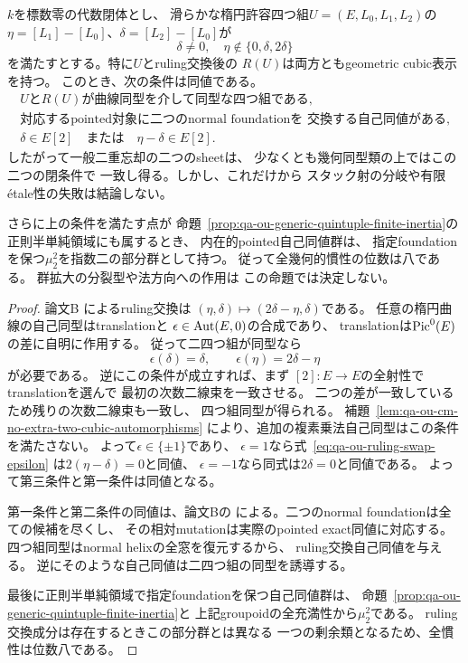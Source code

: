 \begin{proposition}[楕円型のruling交換自己同値の正確な二捩れ条件]
\label{prop:qa-elliptic-ruling-swap-two-torsion}
$k$を標数零の代数閉体とし、
滑らかな楕円許容四つ組$U=(E,L_0,L_1,L_2)$の
$\eta=[L_1]-[L_0]$、$\delta=[L_2]-[L_0]$が
\[
 \delta\ne0,\quad \eta\notin\{0,\delta,2\delta\}
\]
を満たすとする。特に$U$とruling交換後の
$R(U)$は両方ともgeometric cubic表示を持つ。
このとき、次の条件は同値である。
\[
 \begin{gathered}
 \text{$U$と$R(U)$が曲線同型を介して同型な四つ組である},\\
 \text{対応するpointed対象に二つのnormal foundationを
 交換する自己同値がある},\\
 \delta\in E[2]\quad\text{または}\quad
 \eta-\delta\in E[2].
 \end{gathered}
 \tag{OU-swap-locus}\label{eq:qa-ou-elliptic-ruling-swap-locus}
\]
したがって一般二重忘却の二つのsheetは、
少なくとも幾何同型類の上ではこの二つの閉条件で
一致し得る。しかし、これだけから
スタック射の分岐や有限étale性の失敗は結論しない。

さらに上の条件を満たす点が
命題~\ref{prop:qa-ou-generic-quintuple-finite-inertia}の
正則半単純領域にも属するとき、
内在的pointed自己同値群は、
指定foundationを保つ$\mu_2^2$を指数二の部分群として持つ。
従って全幾何的慣性の位数は八である。
群拡大の分裂型や法方向への作用は
この命題では決定しない。
\end{proposition}
\begin{proof}
論文B
\cite[\texttt{lem:elliptic-two-reflections}]{QuadricModuli2026}
によるruling交換は
$(\eta,\delta)\mapsto(2\delta-\eta,\delta)$である。
任意の楕円曲線の自己同型はtranslationと
$\epsilon\in\operatorname{Aut}(E,0)$の合成であり、
translationは$\operatorname{Pic}^0(E)$の差に自明に作用する。
従って二四つ組が同型なら
\[
 \epsilon(\delta)=\delta,\qquad
 \epsilon(\eta)=2\delta-\eta
 \tag{OU-swap-eq}\label{eq:qa-ou-ruling-swap-epsilon}
\]
が必要である。
逆にこの条件が成立すれば、まず
$[2]:E\to E$の全射性でtranslationを選んで
最初の次数二線束を一致させる。
二つの差が一致しているため残りの次数二線束も一致し、
四つ組同型が得られる。
補題~\ref{lem:qa-ou-cm-no-extra-two-cubic-automorphisms}
により、追加の複素乗法自己同型はこの条件を満たさない。
よって$\epsilon\in\{\pm1\}$であり、
$\epsilon=1$なら式~\eqref{eq:qa-ou-ruling-swap-epsilon}
は$2(\eta-\delta)=0$と同値、
$\epsilon=-1$なら同式は$2\delta=0$と同値である。
よって第三条件と第一条件は同値となる。

第一条件と第二条件の同値は、論文Bの
\cite[\texttt{cor:two-intrinsic-foundations},
\texttt{cor:h2-point-groupoid-foundation}]{QuadricModuli2026}
による。二つのnormal foundationは全ての候補を尽くし、
その相対mutationは実際のpointed exact同値に対応する。
四つ組同型はnormal helixの全窓を復元するから、
ruling交換自己同値を与える。
逆にそのような自己同値は二四つ組の同型を誘導する。

最後に正則半単純領域で指定foundationを保つ自己同値群は、
命題~\ref{prop:qa-ou-generic-quintuple-finite-inertia}と
上記groupoidの全充満性から$\mu_2^2$である。
ruling交換成分は存在するときこの部分群とは異なる
一つの剰余類となるため、全慣性は位数八である。
\end{proof}

